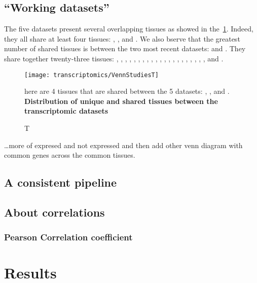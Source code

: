 \subsection{``Working datasets''}

The five datasets present several overlapping tissues as showed in
the~\cref{fig:VennStudiesT}. Indeed, they all share at least four tissues:
, ,  and . We also
bserve that the greatest number of shared tissues is between the two most recent
datasets:  and . They share together twenty-three
tissues: , , ,
, , ,
, , , ,
, , , ,
, , ,
, , , ,
 and .


\begin{figure}[!htbp]
    \texttt{[image: transcriptomics/VennStudiesT]}\centering
    \caption[Distribution of unique and shared tissues between the
    transcriptomic datasets]There are 4 tissues that are shared between the 5
    datasets: , ,  and .%
    {\label{fig:VennStudiesT}\textbf{Distribution of unique and shared tissues
    between the transcriptomic datasets}}
\end{figure}

\ldots more of expresed and not expressed and then add other venn diagram with 
common genes across the common tissues.

\subsection{A consistent pipeline}

\subsection{About correlations}

\subsubsection{Pearson Correlation coefficient}

\section{Results}\label{sec:Trans_Results}
